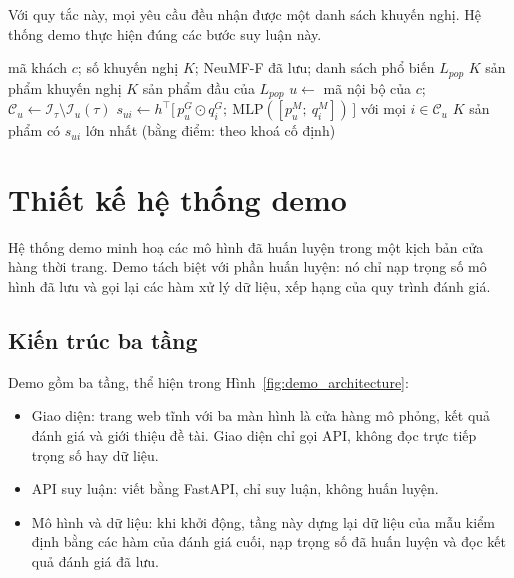 Với quy tắc này, mọi yêu cầu đều nhận được một danh sách khuyến nghị. Hệ thống demo thực hiện đúng các bước suy luận này.

\begin{algorithm}[H]
\caption{Suy luận Top-$K$ cho một khách hàng}
\label{alg:inference}
\begin{algorithmic}[1]
\Require mã khách $c$; số khuyến nghị $K$; NeuMF-F đã lưu; danh sách phổ biến $L_{pop}$
\Ensure $K$ sản phẩm khuyến nghị
 
    \State \Return $K$ sản phẩm đầu của $L_{pop}$
\EndIf
\State $u \gets$ mã nội bộ của $c$; \ $\mathcal{C}_u \gets \mathcal{I}_\tau \setminus \mathcal{I}_u(\tau)$ 
\State $s_{ui} \gets h^\top \big[\,p^G_u \odot q^G_i;\ \mathrm{MLP}([p^M_u;\ q^M_i])\,\big]$ với mọi $i \in \mathcal{C}_u$
\State \Return $K$ sản phẩm có $s_{ui}$ lớn nhất (bằng điểm: theo khoá cố định)
\end{algorithmic}
\end{algorithm}

\section{Thiết kế hệ thống demo}
\label{sec:demo_design}

Hệ thống demo minh hoạ các mô hình đã huấn luyện trong một kịch bản cửa hàng thời trang. Demo tách biệt với phần huấn luyện: nó chỉ nạp trọng số mô hình đã lưu và gọi lại các hàm xử lý dữ liệu, xếp hạng của quy trình đánh giá.

\subsection{Kiến trúc ba tầng}
\label{subsec:demo_architecture}

Demo gồm ba tầng, thể hiện trong Hình~\ref{fig:demo_architecture}:
\begin{itemize}
    \item Giao diện: trang web tĩnh với ba màn hình là cửa hàng mô phỏng, kết quả đánh giá và giới thiệu đề tài. Giao diện chỉ gọi API, không đọc trực tiếp trọng số hay dữ liệu.
    \item API suy luận: viết bằng FastAPI, chỉ suy luận, không huấn luyện.
    \item Mô hình và dữ liệu: khi khởi động, tầng này dựng lại dữ liệu của mẫu kiểm định bằng các hàm của đánh giá cuối, nạp trọng số đã huấn luyện và đọc kết quả đánh giá đã lưu.
\end{itemize}

